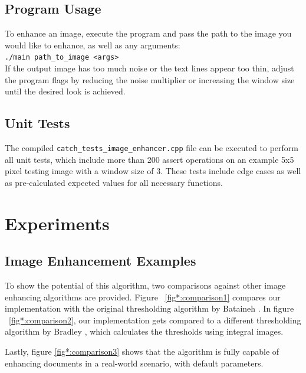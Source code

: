 \documentclass[sigconf]{acmart}
\begin{document}
\subsection{Program Usage}
To enhance an image, execute the program and pass the path to the image you would like to enhance, as well as any arguments:\\ \texttt{./main path\_to\_image <args>} \\
If the output image has too much noise or the text lines appear too thin, adjust the program flags by reducing the noise multiplier or increasing the window size until the desired look is achieved.

\subsection{Unit Tests}
The compiled \texttt{catch\_tests\_image\_enhancer.cpp} file can be executed to perform all unit tests, which include more than 200 assert operations on an example 5x5 pixel testing image with a window size of 3. These tests include edge cases as well as pre-calculated expected values for all necessary functions.

\section{Experiments}

\subsection{Image Enhancement Examples}

To show the potential of this algorithm, two comparisons against other image enhancing algorithms are provided. Figure ~\ref{fig*:comparison1} compares our implementation with the original thresholding algorithm by Bataineh \cite{Bataineh2011}.
In figure ~\ref{fig*:comparison2}, our implementation gets compared to a different thresholding algorithm by Bradley \cite{Bradley2007}, which calculates the thresholds using integral images.

Lastly, figure \ref{fig*:comparison3} shows that the algorithm is fully capable of enhancing documents in a real-world scenario, with default parameters.
\end{document}
